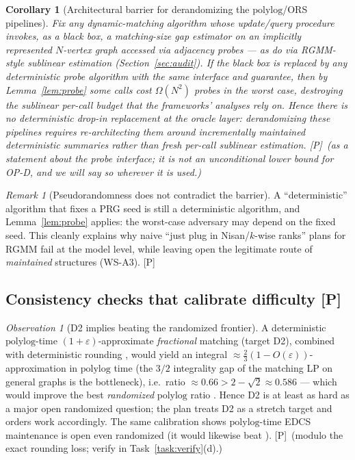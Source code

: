 \documentclass[11pt]{article}
\newtheorem{corollary}[theorem]{Corollary}
\theoremstyle{definition}
\theoremstyle{remark}
\newtheorem{remark}[theorem]{Remark}
\newtheorem{observation}[theorem]{Observation}
\newcommand{\statusP}{\textcolor{blue!60!black}{\textsf{[P]}}}
\newcommand{\polylog}{\mathrm{polylog}}
\newcommand{\eps}{\varepsilon}
\begin{document}
\begin{corollary}[Architectural barrier for derandomizing the
$\polylog$/ORS pipelines]
\label{cor:barrier}
Fix any dynamic-matching algorithm whose update/query procedure invokes,
as a black box, a matching-size gap estimator on an implicitly
represented $N$-vertex graph accessed via adjacency probes --- as do
\cite{BKSW23,Beh23,ABR24,BG24,AKK25} via RGMM-style sublinear estimation
\cite{Beh21} (Section~\ref{sec:audit}). If the black box is replaced by
any \emph{deterministic} probe algorithm with the same interface and
guarantee, then by Lemma~\ref{lem:probe} some calls cost
$\Omega(N^2)$ probes in the worst case, destroying the sublinear
per-call budget that the frameworks' analyses rely on. Hence there is no
deterministic \emph{drop-in} replacement at the oracle layer:
derandomizing these pipelines requires re-architecting them around
\emph{incrementally maintained deterministic summaries} rather than
fresh per-call sublinear estimation. \statusP\ (as a statement about the
probe interface; it is \emph{not} an unconditional lower bound for OP-D,
and we will say so wherever it is used.)
\end{corollary}

\begin{remark}[Pseudorandomness does not contradict the barrier]
A ``deterministic'' algorithm that fixes a PRG seed is still a
deterministic algorithm, and Lemma~\ref{lem:probe} applies: the
worst-case adversary may depend on the fixed seed. This cleanly explains
why naive ``just plug in Nisan/$k$-wise ranks'' plans for RGMM fail at
the model level, while leaving open the legitimate route of
\emph{maintained} structures (WS-A3). \statusP
\end{remark}

\subsection{Consistency checks that calibrate difficulty \statusP}
\label{sec:consistency}

\begin{observation}[D2 implies beating the randomized frontier]
\label{obs:d2hard}
A deterministic $\polylog$-time $(1+\eps)$-approximate \emph{fractional}
matching (target D2), combined with deterministic rounding
\cite{BK21,ACCSW18}, would yield an integral
$\approx\frac{2}{3}(1-O(\eps))$-approximation in $\polylog$ time
(the $3/2$ integrality gap of the matching LP on general graphs is the
bottleneck), i.e.\ ratio $\approx 0.66 > 2-\sqrt2\approx 0.586$ ---
which would improve the best \emph{randomized} $\polylog$ ratio
\cite{ABR24}. Hence D2 is at least as hard as a major open randomized
question; the plan treats D2 as a stretch target and orders work
accordingly. The same calibration shows $\polylog$-time EDCS
maintenance is open even randomized (it would likewise beat
\cite{ABR24}). \statusP\ (modulo the exact rounding loss; verify in
Task~\ref{task:verify}(d).)
\end{observation}
\end{document}
